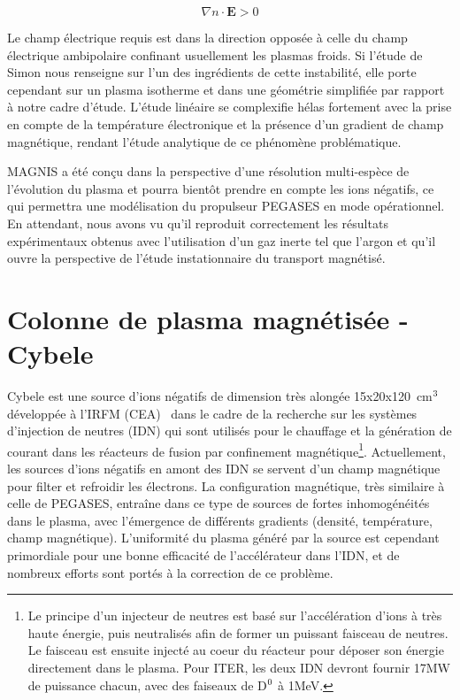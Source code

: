 \begin{refsection}
	\begin{equation}
		\nabla n\cdot \mathbf E>0
	\end{equation}
	
	Le champ électrique requis est dans la direction opposée à celle du champ
	électrique ambipolaire confinant usuellement les plasmas froids. Si l'étude de
	Simon nous renseigne sur l'un des ingrédients de cette instabilité, elle porte
	cependant sur un plasma isotherme et dans une géométrie simplifiée par rapport
	à notre cadre d'étude. L'étude linéaire se complexifie hélas fortement avec la
	prise en compte de la température électronique et la présence d'un gradient
	de champ magnétique, rendant l'étude analytique de ce phénomène problématique.

	MAGNIS a été conçu dans la perspective d'une résolution multi-espèce de
	l'évolution du plasma et pourra bientôt prendre en compte les ions
	négatifs, ce qui permettra une modélisation du propulseur PEGASES en mode
	opérationnel. En attendant, nous avons vu qu'il reproduit correctement les
	résultats expérimentaux obtenus avec l'utilisation d'un gaz inerte tel que
	l'argon et qu'il ouvre la perspective de l'étude instationnaire du transport
	magnétisé.
	
\section{Colonne de plasma magnétisée - Cybele}
Cybele est une source d'ions négatifs de
dimension très alongée 15x20x120~cm$^{{3}}$ développée à
l'IRFM (CEA)~\parencite{Simonin} dans le cadre de la recherche sur les systèmes
d'injection de neutres (IDN) qui sont utilisés pour le chauffage et la
génération de courant dans les réacteurs de fusion par confinement magnétique\footnote{Le principe d'un
injecteur de neutres est basé sur l'accélération d'ions à très haute énergie,
puis neutralisés afin de former un puissant faisceau de neutres.
Le faisceau est ensuite injecté au coeur du réacteur pour déposer son énergie
directement dans le plasma. Pour ITER, les deux IDN devront fournir 17MW de
puissance chacun, avec des faiseaux de D$^{{0}}$ à 1MeV.}.
Actuellement, les sources d'ions négatifs en amont des IDN se servent d'un champ
magnétique pour filter et refroidir les électrons. La configuration magnétique,
très similaire à celle de PEGASES, entraîne dans ce type de sources de fortes
inhomogénéités dans le plasma, avec l'émergence de différents gradients
(densité, température, champ magnétique). L'uniformité du plasma généré par
la source est cependant primordiale pour une bonne efficacité de l'accélérateur
dans l'IDN, et de nombreux efforts sont portés à la correction de ce problème.


\end{refsection}
